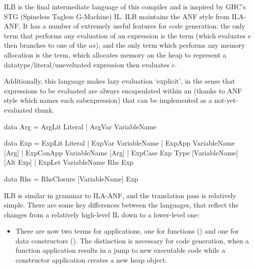 \documentclass[dissertation.tex]{subfiles}
\begin{document}
{{{            ILB is the final intermediate language of this compiler and is inspired by GHC's STG (Spineless Tagless
            G-Machine) IL. ILB maintains the ANF style from ILA-ANF. It has a number of extremely useful features for
            code generation: the only term that performs any evaluation of an expression is the  term (which evaluates \(e\) then branches to one of the \(as\)), and the only term which
            performs any memory allocation is the \haskell{ExpLit #\(v\ r\ e\)#} term, which allocates memory on the
            heap to represent a datatype/literal/uneveluated expression then evaluates \(e\).

            Additionally, this language makes lazy evaluation `explicit', in the sense that expressions to be evaluated
            are always encapsulated within an \haskell{RhsClosure} (thanks to ANF style which names each subexpression)
            that can be implemented as a not-yet-evaluated thunk.

            \begin{haskellfigure}
            data Arg = ArgLit Literal
                     | ArgVar VariableName

            data Exp = ExpLit Literal
                     | ExpVar VariableName
                     | ExpApp VariableName [Arg]
                     | ExpConApp VariableName [Arg]
                     | ExpCase Exp Type [VariableName] [Alt Exp]
                     | ExpLet VariableName Rhs Exp

            data Rhs = RhsClosure [VariableName] Exp
            \end{haskellfigure}

            ILB is similar in grammar to ILA-ANF, and the translation pass is relatively simple. There are some key
            differences between the languages, that reflect the changes from a relatively high-level IL down to a
            lower-level one:

            \begin{itemize}
            \item
            {

                There are now two terms for applications, one for functions () and one for data
                constructors (\haskell{ExpConApp}). The distinction is necessary for code generation, when a function
                application results in a jump to new executable code while a constructor application creates a new heap
                object.

}
\end{itemize}}}}
\end{document}
